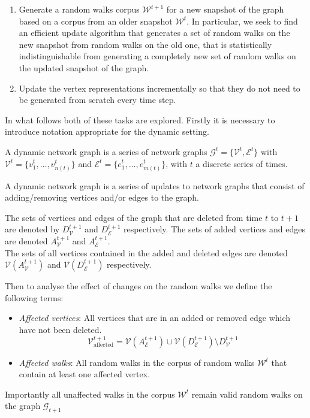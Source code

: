 \documentclass[a4paper]{article}
\renewcommand{\G}{\mathcal G}
\renewcommand{\V}{\mathcal V}
\newcommand{\W}{\mathcal W}
\begin{document}
\begin{enumerate}
\item Generate a random walks corpus $\W^{t+1}$ for a new snapshot of the graph based on
  a corpus from an older snapshot $\W^t$. In particular,
  we seek to find an efficient update algorithm that generates a set of random
  walks on the new snapshot from random walks on the old one, that is
  statistically indistinguishable from generating a completely new set of random walks on the updated snapshot of the graph.
  
\item  Update the vertex representations incrementally so that they do not need
  to be generated from scratch every time step.
  
\end{enumerate}
In what follows both of these tasks are explored. Firstly it is necessary to introduce notation appropriate for the dynamic setting.
\begin{definition}
A dynamic network graph is a series of network graphs $\G^t = \{\V^t,
  \mathcal{E}^t\}$ with $\V^t = \{v_1^t, \dots, v_{n(t)}^t\}$ and $\mathcal{E}^t = \{e_1^t, \dots,
  e_{m(t)}^t\}$, with $t$ a discrete series of times.
\end{definition}
A dynamic network graph is a series of updates to network graphs that consist of
adding/removing vertices and/or edges to the graph.
\begin{definition}
  The sets of vertices and edges of the graph that are deleted from time $t$
  to $t+1$ are denoted by $D_{\V}^{t+1}$ and $D_{\mathcal{E}}^{t+1}$ respectively. The
  sets of added vertices and edges are denoted $A_{\V}^{t+1}$ and
  $A_{\mathcal{E}}^{t+1}$.\\
  The sets of all vertices contained in the added and deleted edges are denoted
  $\V(A_{\V}^{t+1})$ and $\V(D_{\mathcal{E}}^{t+1})$ respectively.
\end{definition}
Then to analyse the effect of changes on the random walks we define the
following terms:
\begin{itemize}
  \item \textit{Affected vertices}: All vertices that are in an added or removed
    edge which have not been deleted.
    \[\V_{\text{affected}}^{t+1} = \V(A_{\mathcal{E}}^{t+1}) \cup
      \V(D_{\mathcal{E}}^{t+1}) \setminus D_{\V}^{t+1}\]
    \item \textit{Affected walks}: All random walks in the corpus of random walks
      $\W^t$ that contain at least one affected vertex.
    \end{itemize}
Importantly all unaffected walks in the corpus $\W^t$ remain valid random walks
on the graph $\G_{t+1}$
\end{document}
